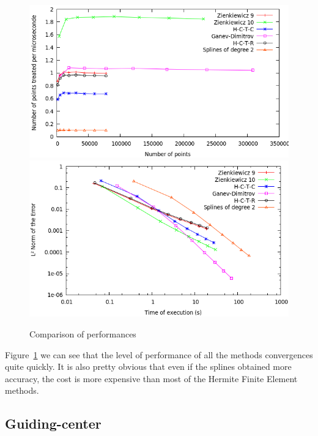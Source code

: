 \documentclass[proc]{edpsmath}
\begin{document}
\begin{figure}[h!]
	\label{fig:circ_performance}
	\includegraphics[scale=0.35]{figures/efficiency.png}
	\includegraphics[scale=0.35]{figures/time_norm.png}
	\caption{Comparison of performances }
\end{figure}

Figure~\ref{fig:circ_performance} we can see that the level of performance of all the methods convergences quite quickly. It is also pretty obvious that even if the splines obtained more accuracy, the cost is more expensive than most of the Hermite Finite Element methods.

\subsection{Guiding-center}
\end{document}
